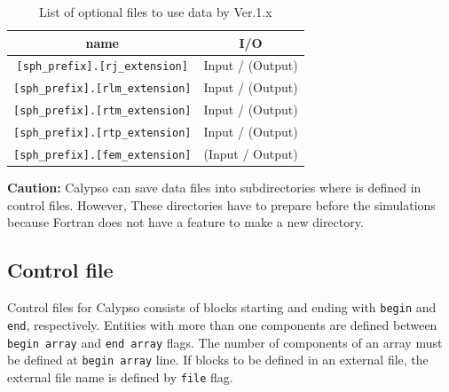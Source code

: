 \begin{table}[htp]
\caption{List of optional files to use data by Ver.1.x}
\begin{center} 
\begin{tabular}{|c|c|}
\hline
 name & I/O \\ \hline \hline
\verb|[sph_prefix].[rj_extension]|  & Input / (Output) \\
\verb|[sph_prefix].[rlm_extension]| & Input / (Output) \\
\verb|[sph_prefix].[rtm_extension]| & Input / (Output) \\
\verb|[sph_prefix].[rtp_extension]| & Input / (Output) \\ \hline
\verb|[sph_prefix].[fem_extension]| & (Input / Output) \\ \hline
\end{tabular}
\end{center}
\label{table:sph_mhd_optional}
\end{table}
%

{\color{red} {\bf Caution:} Calypso can save data files into subdirectories where is defined in control files. However, These directories have to prepare before the simulations because Fortran does not have a feature to make a new directory.}

%
\newpage
\subsection{Control file}
Control files for Calypso consists of blocks starting and ending with \verb|begin| and \verb|end|, respectively. Entities with more than one components are defined between \verb|begin array| and \verb|end array| flags. The number of components of an array must be defined at \verb|begin array| line. If blocks to be defined in an external file, the external file name is defined by \verb|file| flag. 

